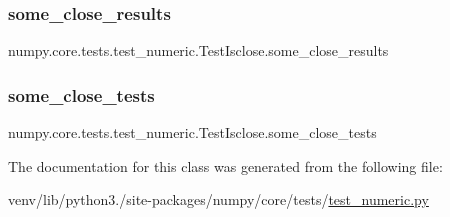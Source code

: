 \subsubsection{\texorpdfstring{some\+\_\+close\+\_\+results}{some\_close\_results}}
{\footnotesize\ttfamily numpy.\+core.\+tests.\+test\+\_\+numeric.\+Test\+Isclose.\+some\+\_\+close\+\_\+results}

\mbox{\label{classnumpy_1_1core_1_1tests_1_1test__numeric_1_1TestIsclose_a4711c87e4f673a7ac6ba0e340e027926}} 
\subsubsection{\texorpdfstring{some\+\_\+close\+\_\+tests}{some\_close\_tests}}
{\footnotesize\ttfamily numpy.\+core.\+tests.\+test\+\_\+numeric.\+Test\+Isclose.\+some\+\_\+close\+\_\+tests}



The documentation for this class was generated from the following file\+:\begin{DoxyCompactItemize}
\item 
venv/lib/python3./site-\/packages/numpy/core/tests/\hyperlink{core_2tests_2test__numeric_8py}{test\+\_\+numeric.\+py}\end{DoxyCompactItemize}
